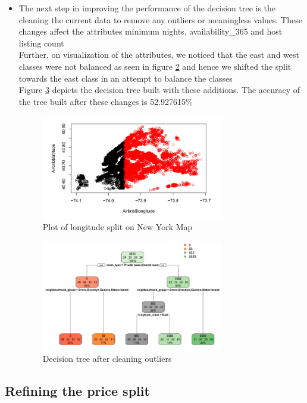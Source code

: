 \documentclass{sig-alternate}
\begin{document}
\begin{itemize}
\begin{figure}[ht]
			\label{decision2}
			\centering
		\end{figure}
		\item The next step in improving the performance of the decision tree is the cleaning the current data to remove any outliers or meaningless values. These changes affect the attributes minimum nights, availability\_365 and host listing count\\
		Further, on visualization of the attributes, we noticed that the east and west classes were not balanced as seen in figure \ref{longsplit} and hence we shifted the split towards the east class in an attempt to balance the classes\\
		Figure \ref{decision3} depicts the decision tree built with these additions. The accuracy of the tree built after these changes is 52.927615\%
		\begin{figure}[ht]
			\includegraphics[width=8cm]{longsplit.PNG}
			\caption{Plot of longitude split on New York Map}
			\label{longsplit}
			\centering
		\end{figure}
		\begin{figure}[ht]
			\includegraphics[width=8cm]{decision3.PNG}
			\caption{Decision tree after cleaning outliers}
			\label{decision3}
			\centering
		\end{figure}
	\end{itemize}
	\subsection{Refining the price split}
\end{document}

